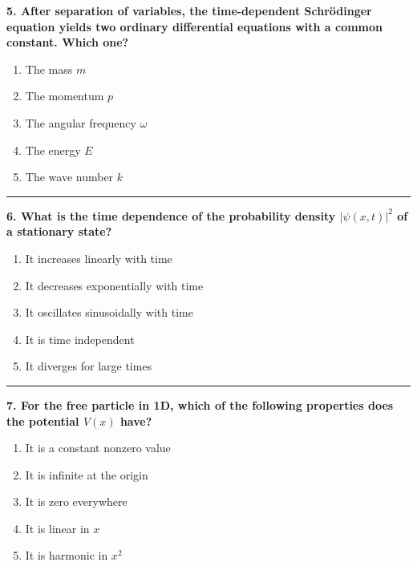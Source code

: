 \documentclass[
  english,
  9pt,
]{extbook}
\providecommand{\tightlist}{%
  \setlength{\itemsep}{0pt}\setlength{\parskip}{0pt}}
\theoremstyle{definition}
\theoremstyle{definition}
\theoremstyle{definition}
\theoremstyle{definition}
\theoremstyle{remark}
\begin{document}
\textbf{5. After separation of variables, the time-dependent Schrödinger equation yields two ordinary differential equations with a common constant. Which one?}

\begin{enumerate}
\def\labelenumi{\alph{enumi}.}
\tightlist
\item
  The mass \(m\)\\
\item
  The momentum \(p\)\\
\item
  The angular frequency \(\omega\)\\
\item
  The energy \(E\)\\
\item
  The wave number \(k\)
\end{enumerate}

\begin{center}\rule{0.5\linewidth}{0.5pt}\end{center}

\textbf{6. What is the time dependence of the probability density \(|\psi(x,t)|^2\) of a stationary state?}

\begin{enumerate}
\def\labelenumi{\alph{enumi}.}
\tightlist
\item
  It increases linearly with time\\
\item
  It decreases exponentially with time\\
\item
  It oscillates sinusoidally with time\\
\item
  It is time independent\\
\item
  It diverges for large times
\end{enumerate}

\begin{center}\rule{0.5\linewidth}{0.5pt}\end{center}

\textbf{7. For the free particle in 1D, which of the following properties does the potential \(V(x)\) have?}

\begin{enumerate}
\def\labelenumi{\alph{enumi}.}
\tightlist
\item
  It is a constant nonzero value
\item
  It is infinite at the origin\\
\item
  It is zero everywhere\\
\item
  It is linear in \(x\)\\
\item
  It is harmonic in \(x^2\)
\end{enumerate}
\end{document}
